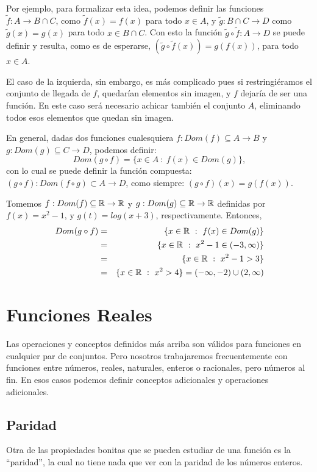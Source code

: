 Por ejemplo, para formalizar esta idea, podemos definir las funciones $\tilde{f}:A\rightarrow B\cap C$, como $\tilde{f}(x)=f(x)$ para todo $x\in A$, y $\tilde{g}:B\cap C\rightarrow D$ como $\tilde{g}(x)=g(x)$ para todo $x\in B\cap C$.
Con esto la función $\tilde{g}\circ\tilde{f}:A\rightarrow D$ se puede definir y resulta, como es de esperarse, $(\tilde{g}\circ\tilde{f}(x))=g(f(x))$, para todo $x\in A$.

El caso de la izquierda, sin embargo, es más complicado pues si restringiéramos el conjunto de llegada de $f$, quedarían elementos sin imagen, y $f$ dejaría de ser una función.
En este caso será necesario achicar también el conjunto $A$, eliminando todos esos elementos que quedan sin imagen.

En general, dadas dos funciones cualesquiera $f:Dom(f)\subseteq A\rightarrow B$ y $g:Dom(g)\subseteq C\rightarrow D$, podemos definir:
$$ Dom(g\circ f)=\{x\in A\ :\ f(x)\in Dom(g)\},$$
con lo cual se puede definir la función compuesta: $(g\circ f):Dom(f\circ g)\subset A\rightarrow D$, como siempre: $(g\circ f)(x)=g(f(x))$.

\vspace{.2cm}

\begin{ejemplo}
Tomemos $f:Dom(f)\subseteq \mathbb{R}\rightarrow \mathbb{R}$ y $g:Dom(g)\subseteq \mathbb{R}\rightarrow \mathbb{R}$ definidas por $f(x)=x^2-1$, y $g(t)=log(x+3)$, respectivamente.
Entonces,
\begin{eqnarray*}
Dom(g\circ f)&=&\{x\in \mathbb{R}\ :\ f(x)\in Dom(g)\}\\
&=&\{x\in \mathbb{R}\ :\ x^2-1\in (-3,\infty)\}\\
&=&\{x\in \mathbb{R}\ :\ x^2-1>3\}\\
&=&\{x\in \mathbb{R}\ :\ x^2>4\}=(-\infty,-2)\cup(2,\infty)
\end{eqnarray*}
\end{ejemplo}

\section{Funciones Reales}

Las operaciones y conceptos definidos más arriba son válidos para funciones en cualquier par de conjuntos.
Pero nosotros trabajaremos frecuentemente con funciones entre números, reales, naturales, enteros o racionales, pero números al fin.
En esos casos podemos definir conceptos adicionales y operaciones adicionales.



\subsection{Paridad}
Otra de las propiedades bonitas que se pueden estudiar de una función es la ``paridad'', la cual no tiene nada que ver con la paridad de los números enteros.

